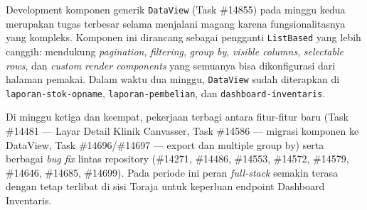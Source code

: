 \begin{logtable}
{        Development komponen generik \texttt{DataView} (Task \#14855) pada minggu kedua
        merupakan tugas terbesar selama menjalani magang karena fungsionalitasnya yang
        kompleks. Komponen ini dirancang sebagai pengganti \texttt{ListBased} yang
        lebih canggih: mendukung \textit{pagination}, \textit{filtering}, \textit{group
            by}, \textit{visible columns}, \textit{selectable rows}, dan \textit{custom
            render components} yang semuanya bisa dikonfigurasi dari halaman pemakai. Dalam
        waktu dua minggu, \texttt{DataView} sudah diterapkan di
        \texttt{laporan-stok-opname}, \texttt{laporan-pembelian}, dan
        \texttt{dashboard-inventaris}.

        Di minggu ketiga dan keempat, pekerjaan terbagi antara fitur-fitur baru (Task
        \#14481 --- Layar Detail Klinik Canvasser, Task \#14586 --- migrasi komponen ke
        DataView, Task \#14696/\#14697 --- export dan multiple group by) serta berbagai
        \textit{bug fix} lintas repository (\#14271, \#14486, \#14553, \#14572,
        \#14579, \#14646, \#14685, \#14699). Pada periode ini peran \textit{full-stack}
        semakin terasa dengan tetap terlibat di sisi Toraja untuk keperluan endpoint
        Dashboard Inventaris. }


\end{logtable}
